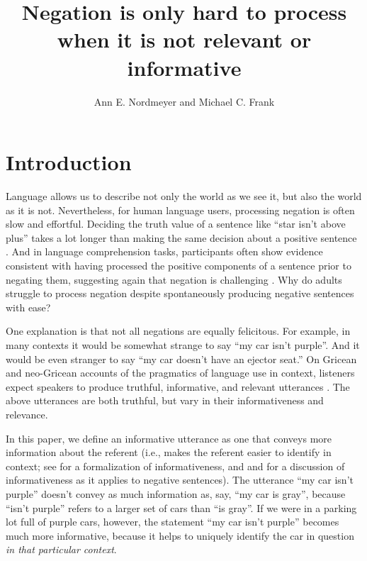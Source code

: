 \documentclass[man, noapacite]{apa2}
\title{Negation is only hard to process when it is not relevant or informative}
\author{Ann E. Nordmeyer and Michael C. Frank}
\affiliation{Department of Psychology, Stanford University \\
Corresponding author: Ann E. Nordmeyer \\
Department of Psychology \\
Stanford University \\
Building 420 (Jordan Hall) \\
450 Serra Mall \\
Stanford, CA 94305 \\
Phone: 650-721-9270 \\
Email: anordmey@stanford.edu }
\begin{document}
\maketitle

\section{Introduction}

Language allows us to describe not only the world as we see it, but also the world as it is not. Nevertheless, for human language users, processing negation is often slow and effortful. Deciding the truth value of a sentence like ``star isn't above plus''  takes a lot longer than making the same decision about a positive sentence \cite{hclark1972, carpenter1975, just1971, just1976}. And in language comprehension tasks, participants often show evidence consistent with having processed the positive components of a sentence prior to negating them, suggesting again that negation is challenging \cite{kaup2003, kaup2006, hasson2006, fischler1983, ludtke2008, ferguson2008}. Why do adults struggle to process negation despite spontaneously producing negative sentences with ease?

One explanation is that not all negations are equally felicitous. For example, in many contexts it would be somewhat strange to say ``my car isn't purple''.  And it would be even stranger to say ``my car doesn't have an ejector seat.''  On Gricean and neo-Gricean accounts of the pragmatics of language use in context, listeners expect speakers to produce truthful, informative, and relevant utterances \cite{grice1975, horn1984, levinson2000, sperber1986}. The above utterances are both truthful, but vary in their informativeness and relevance.

In this paper, we define an informative utterance as one that conveys more information about the referent (i.e., makes the referent easier to identify in context; see  for a formalization of informativeness, and  and  for a discussion of informativeness as it applies to negative sentences). The utterance ``my car isn't purple'' doesn't convey as much information as, say, ``my car is gray'', because ``isn't purple'' refers to a larger set of cars than ``is gray''. If we were in a parking lot full of purple cars, however, the statement ``my car isn't purple'' becomes much more informative, because it helps to uniquely identify the car in question \emph{in that particular context}.
\end{document}
